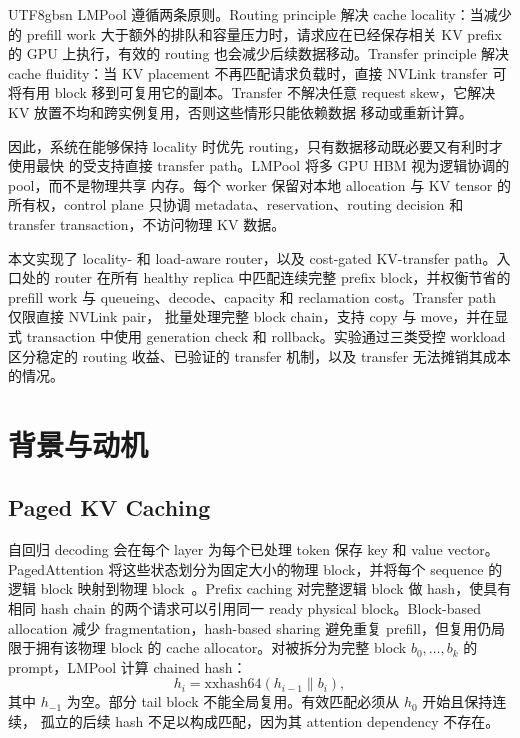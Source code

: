 \documentclass[11pt,a4paper]{article}
\newcommand{\sys}{LMPool}
\begin{document}
\begin{CJK*}{UTF8}{gbsn}
\sys{} 遵循两条原则。Routing principle 解决 cache locality：当减少的 prefill work
大于额外的排队和容量压力时，请求应在已经保存相关 KV prefix 的 GPU 上执行，有效的
routing 也会减少后续数据移动。Transfer principle 解决 cache fluidity：当 KV placement
不再匹配请求负载时，直接 NVLink transfer 可将有用 block 移到可复用它的副本。Transfer
不解决任意 request skew，它解决 KV 放置不均和跨实例复用，否则这些情形只能依赖数据
移动或重新计算。

因此，系统在能够保持 locality 时优先 routing，只有数据移动既必要又有利时才使用最快
的受支持直接 transfer path。\sys{} 将多 GPU HBM 视为逻辑协调的 pool，而不是物理共享
内存。每个 worker 保留对本地 allocation 与 KV tensor 的所有权，control plane 只协调
metadata、reservation、routing decision 和 transfer transaction，不访问物理 KV 数据。

本文实现了 locality- 和 load-aware router，以及 cost-gated KV-transfer path。入口处的
router 在所有 healthy replica 中匹配连续完整 prefix block，并权衡节省的 prefill work
与 queueing、decode、capacity 和 reclamation cost。Transfer path 仅限直接 NVLink pair，
批量处理完整 block chain，支持 copy 与 move，并在显式 transaction 中使用 generation
check 和 rollback。实验通过三类受控 workload 区分稳定的 routing 收益、已验证的 transfer
机制，以及 transfer 无法摊销其成本的情况。

\section{背景与动机}

\subsection{Paged KV Caching}

自回归 decoding 会在每个 layer 为每个已处理 token 保存 key 和 value vector。
PagedAttention 将这些状态划分为固定大小的物理 block，并将每个 sequence 的逻辑 block
映射到物理 block~\citep{vLLM}。Prefix caching 对完整逻辑 block 做 hash，使具有相同
hash chain 的两个请求可以引用同一 ready physical block。Block-based allocation 减少
fragmentation，hash-based sharing 避免重复 prefill，但复用仍局限于拥有该物理 block 的
cache allocator。对被拆分为完整 block $b_0,\ldots,b_k$ 的 prompt，\sys{} 计算 chained hash：
\begin{equation}
  h_i = \mathrm{xxhash64}(h_{i-1} \parallel b_i),
\end{equation}
其中 $h_{-1}$ 为空。部分 tail block 不能全局复用。有效匹配必须从 $h_0$ 开始且保持连续，
孤立的后续 hash 不足以构成匹配，因为其 attention dependency 不存在。


\end{CJK*}
\end{document}
